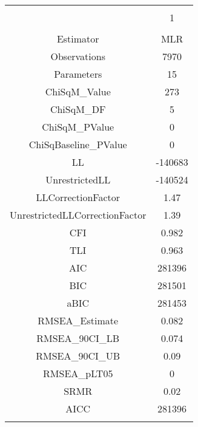 
\begin{table}[!htbp] \centering 
  \caption{} 
  \label{} 
\begin{tabular}{@{\extracolsep{5pt}} cc} 
\\[-1.8ex]\hline 
\hline \\[-1.8ex] 
 & 1 \\ 
\hline \\[-1.8ex] 
Estimator & MLR \\ 
Observations & 7970 \\ 
Parameters & 15 \\ 
ChiSqM\_Value & 273 \\ 
ChiSqM\_DF & 5 \\ 
ChiSqM\_PValue & 0 \\ 
ChiSqBaseline\_PValue & 0 \\ 
LL & -140683 \\ 
UnrestrictedLL & -140524 \\ 
LLCorrectionFactor & 1.47 \\ 
UnrestrictedLLCorrectionFactor & 1.39 \\ 
CFI & 0.982 \\ 
TLI & 0.963 \\ 
AIC & 281396 \\ 
BIC & 281501 \\ 
aBIC & 281453 \\ 
RMSEA\_Estimate & 0.082 \\ 
RMSEA\_90CI\_LB & 0.074 \\ 
RMSEA\_90CI\_UB & 0.09 \\ 
RMSEA\_pLT05 & 0 \\ 
SRMR & 0.02 \\ 
AICC & 281396 \\ 
\hline \\[-1.8ex] 
\end{tabular} 
\end{table} 
